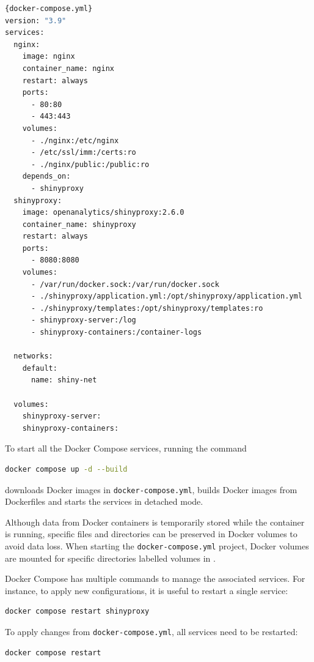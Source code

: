 \begin{lstlisting}[caption=Shortened version of the \texttt{docker-compose.yml} file used for the project. This version only contains the configuration for Nginx and ShinyProxy.,language=bash,label={lst:docker-compose.yml}]{docker-compose.yml}
version: "3.9"
services:
  nginx:
    image: nginx
    container_name: nginx
    restart: always
    ports:
      - 80:80
      - 443:443
    volumes:
      - ./nginx:/etc/nginx
      - /etc/ssl/imm:/certs:ro
      - ./nginx/public:/public:ro
    depends_on:
      - shinyproxy
  shinyproxy:
    image: openanalytics/shinyproxy:2.6.0
    container_name: shinyproxy
    restart: always
    ports:
      - 8080:8080
    volumes:
      - /var/run/docker.sock:/var/run/docker.sock
      - ./shinyproxy/application.yml:/opt/shinyproxy/application.yml
      - ./shinyproxy/templates:/opt/shinyproxy/templates:ro
      - shinyproxy-server:/log
      - shinyproxy-containers:/container-logs
      
  networks:
    default:
      name: shiny-net
      
  volumes:
    shinyproxy-server:
    shinyproxy-containers:
\end{lstlisting}

To start all the Docker Compose services, running the command
\begin{lstlisting}[language=bash,numbers=none]
docker compose up -d --build
\end{lstlisting}
downloads Docker images in \texttt{docker-compose.yml}, builds Docker images from Dockerfiles and starts the services in detached mode.

Although data from Docker containers is temporarily stored while the container is running, specific files and directories can be preserved in Docker volumes to avoid data loss. When starting the \texttt{docker-compose.yml} project, Docker volumes are mounted for specific directories labelled volumes in .

Docker Compose has multiple commands to manage the associated services. For instance, to apply new configurations, it is useful to restart a single service:
\begin{lstlisting}[language=bash,numbers=none]
docker compose restart shinyproxy
\end{lstlisting}

To apply changes from \texttt{docker-compose.yml}, all services need to be restarted:
\begin{lstlisting}[language=bash,numbers=none]
docker compose restart
\end{lstlisting}


